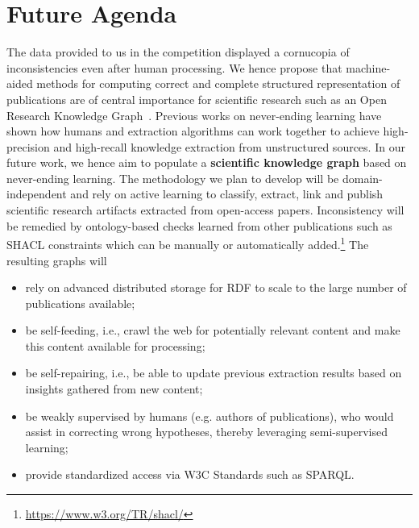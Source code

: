 \documentclass[runningheads]{llncs}
\begin{document}
\section{Future Agenda}
The data provided to us in the competition displayed a cornucopia of inconsistencies even after human processing. We hence propose that machine-aided methods for computing correct and complete structured representation of publications are of central importance for scientific research such as an Open Research Knowledge Graph~\cite{DBLP:journals/corr/abs-1901-10816}\cite{DBLP:conf/esws/BuscaldiDMOR19}. Previous works on never-ending learning have shown how humans and extraction algorithms can work together to achieve high-precision and high-recall knowledge extraction from unstructured sources. In our future work, we hence aim to 
populate a \textbf{scientific knowledge graph} based on never-ending learning. The methodology we plan to develop will be domain-independent and rely on active learning to classify, extract, link and publish scientific research artifacts extracted from open-access papers.  %
Inconsistency will be remedied by ontology-based checks learned from other publications such as SHACL constraints which can be manually or automatically added.\footnote{\url{https://www.w3.org/TR/shacl/}}
The resulting graphs will
\begin{itemize}
    \item rely on advanced distributed storage for RDF to scale to the large number of publications available;
    \item be self-feeding, i.e., crawl the web for potentially relevant content and make this content available for processing;
    \item be self-repairing, i.e., be able to update previous extraction results based on insights gathered from new content;
    \item be weakly supervised by humans (e.g. authors of publications), who would assist in correcting wrong hypotheses, thereby leveraging semi-supervised learning;
    \item provide standardized access via W3C Standards such as SPARQL.
\end{itemize}
\end{document}
